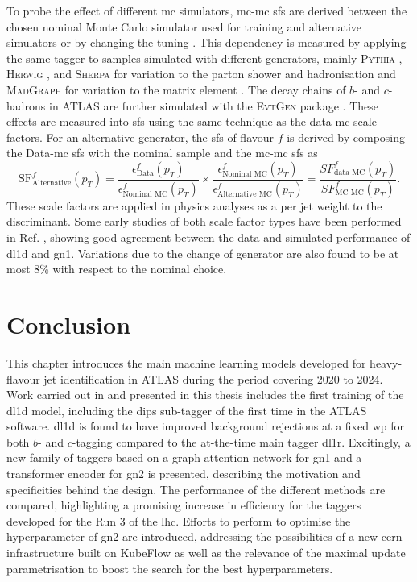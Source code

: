 To probe the effect of different \gls{mc} simulators, \gls{mc}-\gls{mc} \glspl{sf} are derived between the chosen nominal Monte Carlo simulator used for training and alternative simulators or by changing the tuning \cite{ATL-PHYS-PUB-2020-009}. This dependency is measured by applying the same tagger to samples simulated with different generators, mainly \textsc{Pythia} \cite{SJOSTRAND2015159}, \textsc{Herwig} \cite{bellm2017herwig}, and \textsc{Sherpa} \cite{sherpa2.2paper} for variation to the parton shower and hadronisation and \textsc{MadGraph} for variation to the matrix element \cite{madgraph}. The decay chains of $b$- and $c$-hadrons in ATLAS are further simulated with the \textsc{EvtGen} package \cite{LANGE2001152}. These effects are measured into \glspl{sf} using the same technique as the data-\gls{mc} scale factors. For an alternative generator, the \glspl{sf} of flavour $f$ is derived by composing the Data-\gls{mc} \glspl{sf} with the nominal sample and the \gls{mc}-\gls{mc} \glspl{sf} as \[\textrm{SF}^f_{\textrm{Alternative}}(p_T) = \frac{\epsilon^f_{\textrm{Data}}(p_T)}{\epsilon^f_{\textrm{Nominal MC}}(p_T)} \times \frac{\epsilon^f_{\textrm{Nominal MC}}(p_T)}{\epsilon^f_{\textrm{Alternative MC}}(p_T)} = \frac{SF^f_{\textrm{data-MC}}(p_T)}{SF^f_{\textrm{MC-MC}}(p_T)}.\] These scale factors are applied in physics analyses as a per jet weight to the discriminant. Some early studies of both scale factor types have been performed in Ref. \cite{ATL-PLOT-FTAG-2023-01}, showing good agreement between the data and simulated performance of \gls{dl1d} and \gls{gn1}. Variations due to the change of generator are also found to be at most 8\% with respect to the nominal choice.

\section{Conclusion}
This chapter introduces the main machine learning models developed for heavy-flavour jet identification in ATLAS during the period covering 2020 to 2024. Work carried out in and presented in this thesis includes the first training of the \gls{dl1d} model, including the \gls{dips} sub-tagger of the first time in the ATLAS software. \gls{dl1d} is found to have improved background rejections at a fixed \gls{wp} for both $b$- and $c$-tagging compared to the at-the-time main tagger \gls{dl1r}. Excitingly, a new family of taggers based on a graph attention network for \gls{gn1} and a transformer encoder for \gls{gn2} is presented, describing the motivation and specificities behind the design. The performance of the different methods are compared, highlighting a promising increase in efficiency for the taggers developed for the Run 3 of the \gls{lhc}. Efforts to perform to optimise the hyperparameter of \gls{gn2} are introduced, addressing the possibilities of a new \gls{cern} infrastructure built on KubeFlow as well as the relevance of the maximal update parametrisation to boost the search for the best hyperparameters. 

